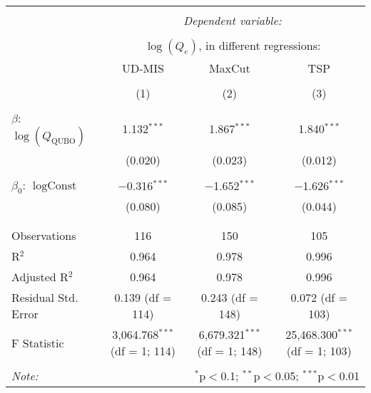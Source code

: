 
\begin{table}[!htbp] \centering 
  \caption{} 
  \label{} 
\begin{tabular}{@{\extracolsep{5pt}}lccc} 
\\[-1.8ex]\hline 
\hline \\[-1.8ex] 
 & \multicolumn{3}{c}{\textit{Dependent variable:}} \\ 
\cline{2-4} 
\\[-1.8ex] & \multicolumn{3}{c}{$\log(Q_e)$, in different regressions:} \\ 
 & UD-MIS & MaxCut & TSP \\ 
\\[-1.8ex] & (1) & (2) & (3)\\ 
\hline \\[-1.8ex] 
 $\beta$: $\log(Q_{\text{QUBO}})$ & 1.132$^{***}$ & 1.867$^{***}$ & 1.840$^{***}$ \\ 
  & (0.020) & (0.023) & (0.012) \\ 
  & & & \\ 
 $\beta_0$: $\log \text{Const}$ & $-$0.316$^{***}$ & $-$1.652$^{***}$ & $-$1.626$^{***}$ \\ 
  & (0.080) & (0.085) & (0.044) \\ 
  & & & \\ 
\hline \\[-1.8ex] 
Observations & 116 & 150 & 105 \\ 
R$^{2}$ & 0.964 & 0.978 & 0.996 \\ 
Adjusted R$^{2}$ & 0.964 & 0.978 & 0.996 \\ 
Residual Std. Error & 0.139 (df = 114) & 0.243 (df = 148) & 0.072 (df = 103) \\ 
F Statistic & 3,064.768$^{***}$ (df = 1; 114) & 6,679.321$^{***}$ (df = 1; 148) & 25,468.300$^{***}$ (df = 1; 103) \\ 
\hline 
\hline \\[-1.8ex] 
\textit{Note:}  & \multicolumn{3}{r}{$^{*}$p$<$0.1; $^{**}$p$<$0.05; $^{***}$p$<$0.01} \\ 
\end{tabular} 
\end{table} 
